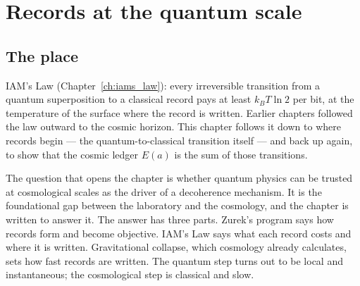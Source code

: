 \chapter{Records at the quantum scale}\label{ch:quantumrecords}

\section*{The place}
IAM's Law (Chapter~\ref{ch:iams_law}): every irreversible transition from a quantum superposition to a classical record pays at least $k_BT\ln2$ per bit,
at the temperature of the surface where the record is written. Earlier chapters followed the law outward to the cosmic horizon. This chapter follows it
down to where records begin --- the quantum-to-classical transition itself --- and back up again, to show that the cosmic ledger $E(a)$ is the sum of
those transitions.

The question that opens the chapter is whether quantum physics can be trusted at cosmological scales as the driver of a decoherence mechanism. It is
the foundational gap between the laboratory and the cosmology, and the chapter is written to answer it. The answer has three parts. Zurek's program
says how records form and become objective. IAM's Law says what each record costs and where it is written. Gravitational collapse, which cosmology
already calculates, sets how fast records are written. The quantum step turns out to be local and instantaneous; the cosmological step is classical and
slow.


